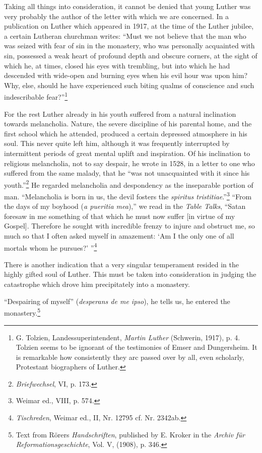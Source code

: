 Taking all things into consideration, it cannot be denied that
young Luther was very probably the author of the letter with which
we are concerned. In a publication on Luther which appeared in
1917, at the time of the Luther jubilee, a certain Lutheran churchman
writes: “Must we not believe that the man who was seized with fear
of sin in the monastery, who was personally acquainted with sin,
possessed a weak heart of profound depth and obscure corners, at
the sight of which he, at times, closed his eyes with trembling, but
into which he had descended with wide-open and burning eyes when
his evil hour was upon him? Why, else, should he have experienced
such biting qualms of conscience and such indescribable fear?”\footnote
{G. Tolzien, Landessuperintendent, \textit{Martin Luther} (Schwerin, 1917), p. 4. Tolzien
seems to be ignorant of the testimonies of Emser and Dungersheim. It is remarkable how
consistently they arc passed over by all, even scholarly, Protestant biographers of Luther.}

For the rest Luther already in his youth suffered from a natural inclination
towards melancholia. Nature, the severe discipline of his parental
home, and the first school which he attended, produced a certain
depressed atmosphere in his soul. This never quite left him, although
it was frequently interrupted by intermittent periods of great mental
uplift and inspiration. Of his inclination to religious melancholia,
not to say despair, he wrote in 1528, in a letter to one who suffered
from the same malady, that he “was not unacquainted with it since
his youth.”\footnote{\textit{Briefwechsel}, VI, p. 173.}
He regarded melancholia and despondency as the
inseparable portion of man. “Melancholia is born in us, the devil
fosters the \textit{spiritus tristitiae}.”\footnote{Weimar ed., VIII, p. 574.}
“From the days of my boyhood (\textit{a pueritia mea}),”
we read in the \textit{Table Talks}, “Satan foresaw in me something
of that which he must now suffer [in virtue of my Gospel].
Therefore he sought with incredible frenzy to injure and obstruct
me, so much so that I often asked myself in amazement: `Am I the
only one of all mortals whom he pursues?' ''\footnote{\textit{Tischreden}, Weimar ed., II, Nr. 12795 cf. Nr. 2342ab.}

There is another indication that a very singular temperament
resided in the highly gifted soul of Luther. This must be taken into
consideration in judging the catastrophe which drove him precipitately into a monastery.

“Despairing of myself” (\textit{desperans de me ipso}), he tells us, he
entered the monastery.\footnote
{Text from Rörers \textit{Handschriften}, published by E. Kroker in the \textit{Archiv für Reformationsgeschichte}, Vol. V, (1908), p. 346.}

